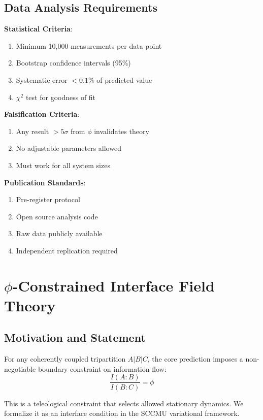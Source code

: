\documentclass[11pt]{article}
\theoremstyle{definition}
\newcommand{\goldenratio}{\phi}
\begin{document}
\subsection{Data Analysis Requirements}

\textbf{Statistical Criteria}:
\begin{enumerate}
\item Minimum 10,000 measurements per data point
\item Bootstrap confidence intervals (95\%)
\item Systematic error $< 0.1\%$ of predicted value
\item $\chi^2$ test for goodness of fit
\end{enumerate}

\textbf{Falsification Criteria}:
\begin{enumerate}
\item Any result $> 5\sigma$ from $\goldenratio$ invalidates theory
\item No adjustable parameters allowed
\item Must work for all system sizes
\end{enumerate}

\textbf{Publication Standards}:
\begin{enumerate}
\item Pre-register protocol
\item Open source analysis code
\item Raw data publicly available
\item Independent replication required
\end{enumerate}

\section{$\goldenratio$-Constrained Interface Field Theory}

\subsection{Motivation and Statement}

For any coherently coupled tripartition $A|B|C$, the core prediction imposes a non-negotiable boundary constraint on information flow:
\begin{equation}
\frac{I(A:B)}{I(B:C)} = \goldenratio
\end{equation}

This is a teleological constraint that selects allowed stationary dynamics. We formalize it as an interface condition in the SCCMU variational framework.
\end{document}
